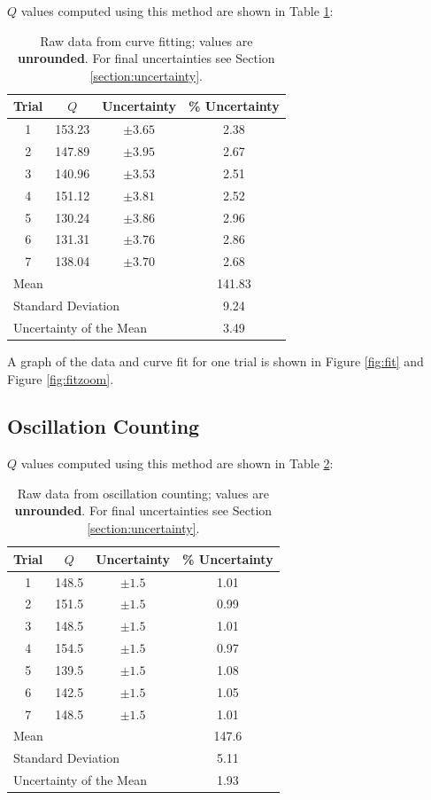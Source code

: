 \documentclass[aps,twocolumn,secnumarabic,nobalancelastpage,amsmath,amssymb,nofootinbib]{revtex4}
\begin{document}
\(Q\) values computed using this method are shown in Table \ref{table:fit}:
\begin{table}[h]
    \begin{tabular}{c|c|c|c}
        Trial & \(Q\) & Uncertainty & \% Uncertainty \\
        \hline
        1   & 153.23    & \(\pm 3.65\) & 2.38 \\
        2   & 147.89    & \(\pm 3.95\) & 2.67 \\
        3	& 140.96	& \(\pm 3.53\) & 2.51 \\
        4	& 151.12	& \(\pm 3.81\) & 2.52 \\
        5	& 130.24	& \(\pm 3.86\) & 2.96 \\
        6	& 131.31	& \(\pm 3.76\) & 2.86 \\
        7	& 138.04	& \(\pm 3.70\) & 2.68 \\
        \hline
        \multicolumn{3}{l}{Mean} & 141.83 \\
        \multicolumn{3}{l}{Standard Deviation} & 9.24 \\
        \multicolumn{3}{l}{Uncertainty of the Mean} & 3.49
    \end{tabular}
    \caption{Raw data from curve fitting; values are \textbf{unrounded}. For final uncertainties see Section
        \ref{section:uncertainty}.}
    \label{table:fit}
\end{table}

A graph of the data and curve fit for one trial is shown in Figure \ref{fig:fit} and Figure \ref{fig:fitzoom}.

\subsection{Oscillation Counting}

\(Q\) values computed using this method are shown in Table \ref{table:oscillation}:
\begin{table}[h]
    \begin{tabular}{c|c|c|c}
        Trial & \(Q\) & Uncertainty & \% Uncertainty \\
        \hline
        1   & 148.5 & \(\pm 1.5\) & 1.01 \\
        2   & 151.5 & \(\pm 1.5\) & 0.99 \\
        3	& 148.5 & \(\pm 1.5\) & 1.01 \\
        4	& 154.5 & \(\pm 1.5\) & 0.97 \\
        5	& 139.5 & \(\pm 1.5\) & 1.08 \\
        6	& 142.5 & \(\pm 1.5\) & 1.05 \\
        7	& 148.5 & \(\pm 1.5\) & 1.01 \\
        \hline
        \multicolumn{3}{l}{Mean} & 147.6 \\
        \multicolumn{3}{l}{Standard Deviation} & 5.11 \\
        \multicolumn{3}{l}{Uncertainty of the Mean} & 1.93
    \end{tabular}
    \caption{Raw data from oscillation counting; values are \textbf{unrounded}. For final uncertainties see Section
        \ref{section:uncertainty}.}
    \label{table:oscillation}
\end{table}
\end{document}
